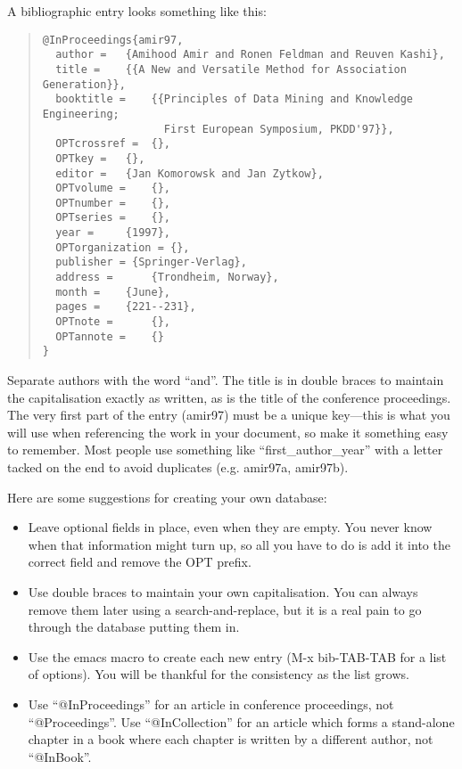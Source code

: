 A bibliographic entry looks something like this:

\linespread{1} \small
\begin{quote}
\begin{verbatim}
@InProceedings{amir97,
  author = 	 {Amihood Amir and Ronen Feldman and Reuven Kashi},
  title = 	 {{A New and Versatile Method for Association Generation}},
  booktitle = 	 {{Principles of Data Mining and Knowledge Engineering;
                   First European Symposium, PKDD'97}},
  OPTcrossref =  {},
  OPTkey = 	 {},
  editor = 	 {Jan Komorowsk and Jan Zytkow},
  OPTvolume = 	 {},
  OPTnumber = 	 {},
  OPTseries = 	 {},
  year = 	 {1997},
  OPTorganization = {},
  publisher = {Springer-Verlag},
  address = 	 {Trondheim, Norway},
  month = 	 {June},
  pages = 	 {221--231},
  OPTnote = 	 {},
  OPTannote = 	 {}
}
\end{verbatim}
\end{quote}

\linespread{1.3} \normalsize
Separate authors with the word ``and''.  The title is in double
braces to maintain the capitalisation exactly as written, as is the
title of the conference proceedings.  The very first part of the entry
(amir97) must be a unique key---this is what you will use when
referencing the work in your document, so make it something easy to
remember.  Most people use something like ``first\_author\_year'' with
a letter tacked on the end to avoid duplicates (e.g. amir97a, amir97b).

Here are some suggestions for creating your own database:
\begin{itemize}
\item Leave optional fields in place, even when they are empty.  You
never know when that information might turn up, so all you have to do
is add it into the correct field and remove the OPT prefix.
\item Use double braces to maintain your own capitalisation.
You can always remove them later using a search-and-replace, but it is
a real pain to go through the database putting them in.
\item Use the emacs macro to create each new entry (M-x bib-TAB-TAB
for a list of options).  You will be thankful for the consistency as
the list grows.
\item Use ``@InProceedings'' for an article in conference proceedings, not
``@Proceedings''.  Use ``@InCollection'' for an article which forms a
stand-alone chapter in a book where each chapter is written by a
different author, not ``@InBook''.
\end{itemize}


